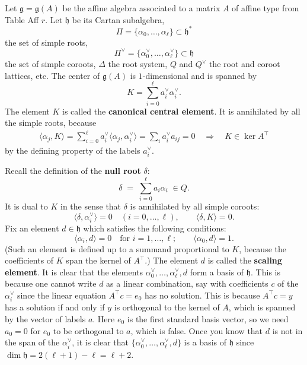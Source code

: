 \documentclass[12pt]{article}
\begin{document}
Let $\mathfrak{g} = \mathfrak{g}(A)$ be the affine algebra associated to a 
matrix $A$ of affine type from Table Aff $r$. Let $\mathfrak{h}$ be its Cartan 
subalgebra,
\[
    \Pi = \{\alpha_0,\dots,\alpha_\ell\} \subset \mathfrak{h}^*
\]
the set of simple roots,
\[
    \Pi^\vee = \{\alpha_0^\vee,\dots,\alpha_\ell^\vee\} \subset \mathfrak{h}
\]
the set of simple coroots, $\Delta$ the root system, $Q$ and $Q^\vee$ the 
root and coroot lattices, etc. The center 
of $\mathfrak{g}(A)$ is $1$-dimensional and is spanned by
\[
    K = \sum_{i=0}^\ell a_i^\vee \alpha_i^\vee.
\]
The element $K$ is called the \textbf{canonical central element}. It is annihilated by all the simple roots, because \begin{align*}
\langle \alpha_j, K \rangle = \sum_{i=0}^\ell a_i^\vee \langle \alpha_j, \alpha_i^\vee \rangle = \sum_i a_i^\vee a_{ij} = 0
\quad \Rightarrow \quad K \in \ker A^\top
\end{align*} by the defining property of the labels $a_i^\vee$.

Recall the definition of the \textbf{null root} $\delta$:
\[
    \delta \;=\; \sum_{i=0}^\ell a_i \alpha_i \;\in Q.
\]
It is dual to $K$ in the sense that $\delta$ is annihilated by all simple coroots:
\[
    \langle \delta, \alpha_i^\vee \rangle = 0 \quad (i=0,\dots,\ell),
    \qquad
    \langle \delta, K \rangle = 0.
\]
Fix an element $d \in \mathfrak{h}$ which satisfies the following conditions:
\[
    \langle \alpha_i, d \rangle = 0 \quad \text{for } i=1,\dots,\ell; 
    \qquad 
    \langle \alpha_0, d \rangle = 1.
\]
(Such an element is defined up to a summand proportional to $K$, because the coefficients of $K$ span the kernel of $A^\top$.) The element $d$ is called the \textbf{scaling element}. 
It is clear that the elements $\alpha_0^\vee,\dots,\alpha_\ell^\vee,d$ form a basis of $\mathfrak{h}$. This is because one cannot write $d$ as a linear combination, say with coefficients $c$ of the $\alpha_i^\vee$ since the linear equation $A^\top c = e_0$ has no solution. This is because $A^\top c = y$ has a solution if and only if $y$ is orthogonal to the kernel of $A$, which is spanned by the vector of labels $a$. Here $e_0$ is the first standard basis vector, so we need $a_0=0$ for $e_0$ to be orthogonal to $a$, which is false. Once you know that $d$ is not in the span of the $\alpha_i^\vee$, it is clear that $\{\alpha_0^\vee,\dots,\alpha_\ell^\vee,d\}$ is a basis of $\mathfrak{h}$ since $\dim\mathfrak{h} = 2(\ell+1) - \ell = \ell+2$.
\end{document}
